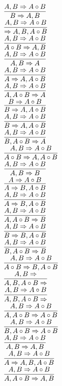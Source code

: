 \documentclass[11pt]{article}
\begin{document}
\begin{center}
\bigskip
\\$\infer{B\Rightarrow A, B}{A, B\Rightarrow A\circ B}$
\bigskip
\\$\infer{\Rightarrow A, B, A\circ B}{A, B\Rightarrow A\circ B}$
\bigskip
\\$\infer{A\circ B\Rightarrow A, B}{A, B\Rightarrow A\circ B}$
\bigskip
\\$\infer{A, B\Rightarrow A}{A, B\Rightarrow A\circ B}$
\bigskip
\\$\infer{A\Rightarrow A, A\circ B}{A, B\Rightarrow A\circ B}$
\bigskip
\\$\infer{A, A\circ B\Rightarrow A}{A, B\Rightarrow A\circ B}$
\bigskip
\\$\infer{B\Rightarrow A, A\circ B}{B\Rightarrow A\circ B}$
\bigskip
\\$\infer{B\Rightarrow A, A\circ B}{A, B\Rightarrow A\circ B}$
\bigskip
\\$\infer{B, A\circ B\Rightarrow A}{A, B\Rightarrow A\circ B}$
\bigskip
\\$\infer{A\circ B\Rightarrow A, A\circ B}{A, B\Rightarrow A\circ B}$
\bigskip
\\$\infer{A, B\Rightarrow B}{A, B\Rightarrow A\circ B}$
\bigskip
\\$\infer{A\Rightarrow B, A\circ B}{A\Rightarrow A\circ B}$
\bigskip
\\$\infer{A\Rightarrow B, A\circ B}{A, B\Rightarrow A\circ B}$
\bigskip
\\$\infer{A, A\circ B\Rightarrow B}{A, B\Rightarrow A\circ B}$
\bigskip
\\$\infer{B\Rightarrow B, A\circ B}{A, B\Rightarrow A\circ B}$
\bigskip
\\$\infer{B, A\circ B\Rightarrow B}{A, B\Rightarrow A\circ B}$
\bigskip
\\$\infer{A\circ B\Rightarrow B, A\circ B}{A, B\Rightarrow A\circ B}$
\bigskip
\\$\infer{A, B, A\circ B\Rightarrow }{A, B\Rightarrow }$
\bigskip
\\$\infer{A, B, A\circ B\Rightarrow }{A, B\Rightarrow A\circ B}$
\bigskip
\\$\infer{A, A\circ B\Rightarrow A\circ B}{A, B\Rightarrow A\circ B}$
\bigskip
\\$\infer{B, A\circ B\Rightarrow A\circ B}{A, B\Rightarrow A\circ B}$
\bigskip
\\$\infer{A, B\Rightarrow A, B}{A, B\Rightarrow A\circ B}$
\bigskip
\\$\infer{A\Rightarrow A, B, A\circ B}{A, B\Rightarrow A\circ B}$
\bigskip
\\$\infer{A, A\circ B\Rightarrow A, B}{A, B\Rightarrow A\circ B}$

\end{center}
\end{document}
